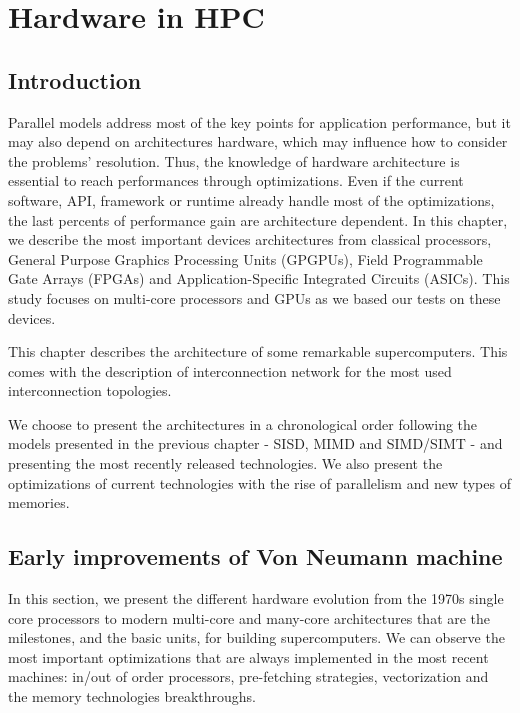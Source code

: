 
\chapter{Hardware in HPC}

\section{Introduction}

Parallel models address most of the key points for application performance, but it may also depend on architectures hardware, which may influence how to consider the problems' resolution. 
Thus, the knowledge of hardware architecture is essential to reach performances through optimizations.
Even if the current software, API, framework or runtime already handle most of the optimizations, the last percents of performance gain are architecture dependent. 
In this chapter, we describe the most important devices architectures from classical processors, General Purpose Graphics Processing Units (GPGPUs), Field Programmable Gate Arrays (FPGAs) and Application-Specific Integrated Circuits (ASICs).
This study focuses on multi-core processors and GPUs as we based our tests on these devices. 

This chapter describes the architecture of some remarkable supercomputers. 
This comes with the description of interconnection network for the most used interconnection topologies. 

We choose to present the architectures in a chronological order following the models presented in the previous chapter - SISD, MIMD and SIMD/SIMT - and presenting the most recently released technologies.
We also present the optimizations of current technologies with the rise of parallelism and new types of memories.

\section{Early improvements of Von Neumann machine}
In this section, we present the different hardware evolution from the 1970s single core processors to modern multi-core and many-core architectures that are the milestones, and the basic units, for building supercomputers. 
We can observe the most important optimizations that are always implemented in the most recent machines: in/out of order processors, pre-fetching strategies, vectorization and the memory technologies breakthroughs. 

